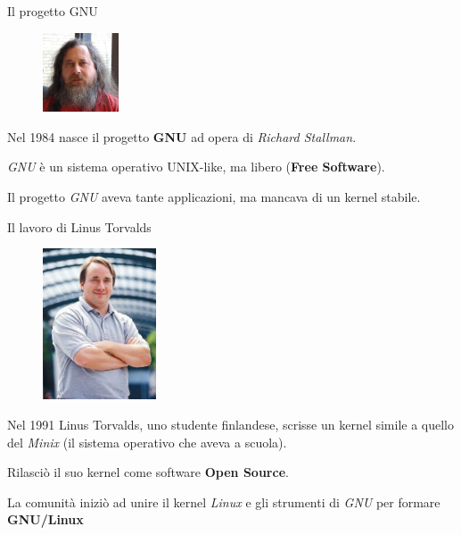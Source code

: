 \documentclass[10pt]{beamer}
\begin{document}
\begin{frame}[fragile]{Il progetto GNU}

\begin{figure}
\centering
\label{fig:stallman}
\includegraphics[width=0.2\textwidth]{stallman}
\end{figure}


Nel 1984 nasce il progetto \textbf{GNU} ad opera di \textit{Richard Stallman}.

\textit{GNU} è un sistema operativo UNIX-like, ma libero (\textbf{Free Software}).

Il progetto \textit{GNU} aveva tante applicazioni, ma mancava di un kernel stabile.

\end{frame}

\begin{frame}[fragile]{Il lavoro di Linus Torvalds}

\begin{figure}
\centering
\label{fig:linus}
\includegraphics[width=0.3\textwidth]{linus}
\end{figure}

Nel 1991 Linus Torvalds, uno studente finlandese, scrisse un kernel simile a quello del \textit{Minix} (il sistema operativo che aveva a scuola).

Rilasciò il suo kernel come software \textbf{Open Source}.

La comunità iniziò ad unire il kernel \textit{Linux} e gli strumenti di \textit{GNU} per formare \textbf{GNU/Linux}

\end{frame}
\end{document}
